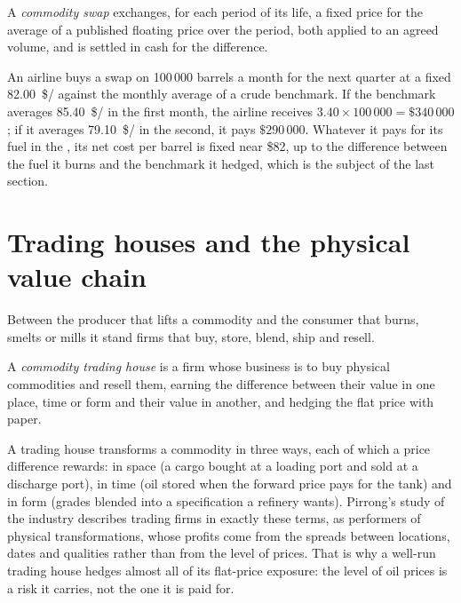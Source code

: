 \begin{definition}\label{def:m3:physical-commodity-markets:swap}
A \emph{commodity swap} exchanges, for each period of its
life, a fixed price for the average of a published floating price over the period,
both applied to an agreed volume, and is settled in cash for the difference.
\end{definition}

\begin{example}\label{ex:m3:physical-commodity-markets:swap}
An airline buys a swap on 100\,000 barrels a month for the next quarter at a fixed
\qty{82.00}{\$/\barrel} against the monthly average of a crude benchmark. If
the benchmark averages \qty{85.40}{\$/\barrel} in the first month, the airline
receives $3.40 \times 100\,000 = \$340\,000$; if it averages \qty{79.10}{\$/\barrel}
in the second, it pays $\$290\,000$. Whatever it pays for its fuel in the
, its net cost per barrel is fixed near \$82, up to the difference
between the fuel it burns and the benchmark it hedged, which is the subject of
the last section.
\end{example}

\section{Trading houses and the physical value chain}

Between the producer that lifts a commodity and the consumer that burns, smelts
or mills it stand firms that buy, store, blend, ship and resell.

\begin{definition}\label{def:m3:physical-commodity-markets:house}
A \emph{commodity trading house} is a firm whose
business is to buy physical commodities and resell them, earning the difference
between their value in one place, time or form and their value in another, and
hedging the flat price with paper.
\end{definition}

A trading house transforms a commodity in three ways, each of which a price
difference rewards: in space (a cargo bought at a loading port and sold at a
discharge port), in time (oil stored when the forward price pays for the tank)
and in form (grades blended into a specification a refinery wants). Pirrong's
study of the industry describes trading firms in exactly these terms, as
performers of physical transformations, whose profits come from the spreads
between locations, dates and qualities rather than from the level of prices.
That is why a well-run trading house hedges almost all of its flat-price
exposure: the level of oil prices is a risk it carries, not the one it is paid
for.

